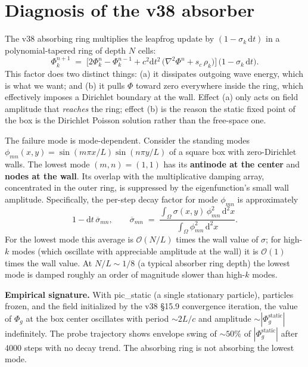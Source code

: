 \documentclass[11pt,a4paper]{article}
\newcommand{\Phig}{\Phi_g}
\newcommand{\order}[1]{\mathcal{O}(#1)}
\newcommand{\dd}{\mathrm{d}}
\begin{document}
\vspace{0.5cm}

\section{Diagnosis of the v38 absorber}

The v38 absorbing ring multiplies the leapfrog update by
$(1 - \sigma_k\,\dd t)$ in a polynomial-tapered ring of depth $N$
cells:
\begin{equation}
  \Phi_k^{n+1} \;=\; \bigl[2\Phi_k^n - \Phi_k^{n-1}
                       + c^2\dd t^2\,\bigl(\nabla^2\Phi^n + s_c\,\rho_k\bigr)\bigr]
                  \,\bigl(1 - \sigma_k\,\dd t\bigr).
\end{equation}
This factor does two distinct things: (a) it dissipates outgoing wave
energy, which is what we want; and (b) it pulls $\Phi$ toward zero
everywhere inside the ring, which effectively imposes a Dirichlet
boundary at the wall.  Effect (a) only acts on field amplitude that
\emph{reaches} the ring; effect (b) is the reason the static
fixed point of the box is the Dirichlet Poisson solution rather
than the free-space one.

The failure mode is mode-dependent.  Consider the standing modes
$\phi_{mn}(x,y) = \sin(m\pi x/L)\sin(n\pi y/L)$ of a square box with
zero-Dirichlet walls.  The lowest mode $(m,n) = (1,1)$ has its
\textbf{antinode at the center} and \textbf{nodes at the wall}.  Its
overlap with the multiplicative damping array, concentrated in the
outer ring, is suppressed by the eigenfunction's small wall
amplitude.  Specifically, the per-step decay factor for mode
$\phi_{mn}$ is approximately
\begin{equation}
  1 - \dd t\,\overline{\sigma}_{mn},
  \qquad
  \overline{\sigma}_{mn}
     \;=\;
     \frac{\int_\Omega \sigma(x,y)\,\phi_{mn}^2\,\dd^2 x}
          {\int_\Omega \phi_{mn}^2\,\dd^2 x}.
\end{equation}
For the lowest mode this average is $\order{N/L}$ times the wall value
of $\sigma$; for high-$k$ modes (which oscillate with appreciable
amplitude at the wall) it is $\order{1}$ times the wall value.  At
$N/L \sim 1/8$ (a typical absorber ring depth) the lowest mode is
damped roughly an order of magnitude slower than high-$k$ modes.

\textbf{Empirical signature.}  With pic\_static (a single stationary
particle), particles frozen, and the field initialized by the v38
\S 15.9 convergence iteration, the value of $\Phig$ at the box center
oscillates with period $\sim 2L/c$ and amplitude $\sim |\Phig^\text{static}|$
indefinitely.  The probe trajectory shows envelope swing of
$\sim 50\%$ of $|\Phig^\text{static}|$ after 4000 steps with no decay
trend.  The absorbing ring is not absorbing the lowest mode.
\end{document}
